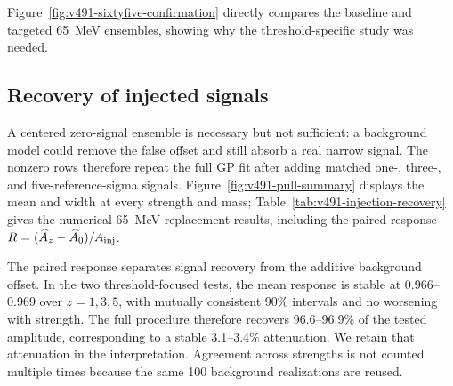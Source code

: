 Figure~\ref{fig:v491-sixtyfive-confirmation} directly compares the baseline and targeted
65~MeV ensembles, showing why the threshold-specific study was needed.

\subsection{Recovery of injected signals}

A centered zero-signal ensemble is necessary but not sufficient: a background model
could remove the false offset and still absorb a real narrow signal.  The nonzero
rows therefore repeat the full GP fit after adding matched one-, three-, and
five-reference-sigma signals.  Figure~\ref{fig:v491-pull-summary} displays the mean
and width at every strength and mass; Table~\ref{tab:v491-injection-recovery} gives
the numerical 65~MeV replacement results, including the paired response
$R=(\widehat A_z-\widehat A_0)/A_{\rm inj}$.

The paired response separates signal recovery from the additive background offset. In
the two threshold-focused tests, the mean response is
stable at 0.966--0.969 over $z=1,3,5$, with mutually consistent 90\% intervals and no
worsening with strength.  The full procedure therefore recovers 96.6--96.9\% of the
tested amplitude, corresponding to a stable 3.1--3.4\% attenuation. We retain that
attenuation in the interpretation.
Agreement across strengths is not counted multiple times because the same 100
background realizations are reused.

